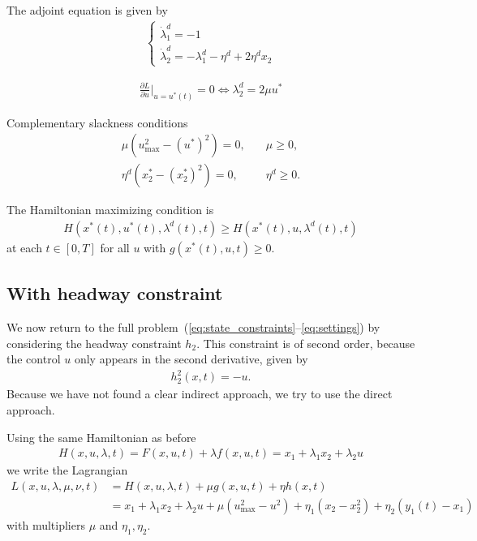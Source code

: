 \documentclass[a4paper]{article}
\theoremstyle{definition}
\theoremstyle{plain}
\begin{document}
The adjoint equation is given by
\begin{align*}
  \begin{cases}
  \dot{\lambda}^{d}_{1} = -1 \\
  \dot{\lambda}^{d}_{2} = -\lambda^{d}_{1} - \eta^{d} + 2\eta^{d} x_{2}
  \end{cases}
\end{align*}

\begin{align*}
  \frac{\partial L}{\partial u}|_{u=u^{*}(t)} = 0 \iff  \lambda^{d}_{2} = 2 \mu u^{*}
\end{align*}


Complementary slackness conditions
\begin{align*}
  \mu (u_{\max}^{2} - {(u^{*})}^{2}) = 0 ,& \quad \mu \geq 0 , \\
 \eta^{d} (x_{2}^{*} - (x_{2}^{*})^{2}) = 0 ,& \quad \eta^{d} \geq 0 .
\end{align*}

The Hamiltonian maximizing condition is
\begin{align*}
  H(x^{*}(t), u^{*}(t), \lambda^{d}(t), t) \geq H(x^{*}(t), u, \lambda^{d}(t), t)
\end{align*}
at each $t \in [0, T]$ for all $u$ with $g(x^{*}(t), u, t) \geq 0$.


\newpage
\subsection{With headway constraint}

We now return to the full problem~(\ref{eq:state_constraints}--\ref{eq:settings}) by considering the headway constraint $h_{2}$.
%
This constraint is of second order, because the control $u$ only appears in the
second derivative, given by
\begin{align*}
  h_{2}^{2}(x, t) = -u .
\end{align*}
Because we have not found a clear indirect approach, we try to use the direct approach.

Using the same Hamiltonian as before
\begin{align*}
  H(x, u, \lambda, t) = F(x,u,t) + \lambda f(x,u,t) = x_{1} + \lambda_{1} x_{2} + \lambda_{2} u
\end{align*}
we write the Lagrangian
\begin{align*}
  L(x, u, \lambda, \mu, \nu, t) &= H(x, u, \lambda, t) + \mu g(x,u,t) + \eta h(x, t) \\
  &= x_{1} + \lambda_{1}x_{2} + \lambda_{2}u + \mu (u_{\max}^{2} - u^{2}) + \eta_{1} (x_{2} - x_{2}^{2}) + \eta_{2}(y_{1}(t) - x_{1})
\end{align*}
with multipliers $\mu$ and $\eta_{1}, \eta_{2}$.
\end{document}
